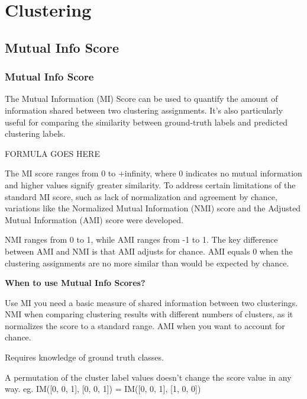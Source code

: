 \chapter{Clustering}


\clearpage
\thispagestyle{clusteringstyle}
\section{Mutual Info Score}
\subsection{Mutual Info Score}

The Mutual Information (MI) Score can be used to quantify the amount of information shared between two clustering assignments.
It's also particularly useful for comparing the similarity between ground-truth labels and predicted clustering labels.

\begin{center}
    FORMULA GOES HERE
\end{center}

The MI score ranges from 0 to +infinity, where 0 indicates no mutual information and higher values signify greater
similarity. To address certain limitations of the standard MI score, such as lack of normalization and agreement by chance, variations like the
Normalized Mutual Information (NMI) score and the Adjusted Mutual Information (AMI) score were developed.

NMI ranges from 0 to 1, while AMI ranges from -1 to 1. The key difference between AMI and NMI is that AMI adjusts for chance. 
AMI equals 0 when the clustering assignments are no more similar than would be expected by chance.

\textbf{When to use Mutual Info Scores?}

Use MI you need a basic measure of shared information between two clusterings. NMI when comparing clustering results with different numbers of
clusters, as it normalizes the score to a standard range. AMI when you want to account for chance.

{
    \item Requires knowledge of ground truth classes.
    \item A permutation of the cluster label values doesn't change the score value in any way. eg. IM([0, 0, 1], [0, 0, 1]) = IM([0, 0, 1], [1, 0, 0])

}

